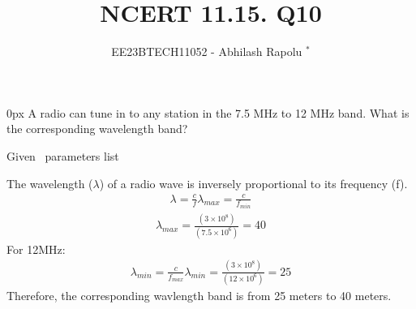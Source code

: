 \documentclass[journal,12pt,twocolumn]{IEEEtran}
\begin{document}

\vspace{3cm}
\title{NCERT 11.15. Q10}
\author{EE23BTECH11052 - Abhilash Rapolu $^{*}$%
}
\maketitle
\newpage
\bigskip
\renewcommand{\thetable}{\arabic{table}}

\parindent 0px
\Question A radio can tune in to any station in the 7.5 MHz to 12 MHz band.
 What is the corresponding wavelength band? \\
\Solution  
\begin{table}[htbp] \small
\centering

\caption{Given \, parameters list}\end{table}
The wavelength ($\lambda$) of a radio wave is inversely proportional to its frequency (f).
\begin{align}
\lambda=\frac{c}{f}
\lambda_{max}=\frac{c}{f_{min}}
\end{align}
\begin{align}
\lambda_{max}=\frac{(3\times10^{8})}{(7.5\times10^{6})}=40
\end{align}
For 12MHz:
\begin{align}
\lambda_{min}=\frac{c}{f_{max}}
\lambda_{min}=\frac{(3\times10^{8})}{(12\times10^{6})}=25
\end{align}
Therefore, the corresponding wavlength band is from 25 meters to 40 meters.
\end{document}
